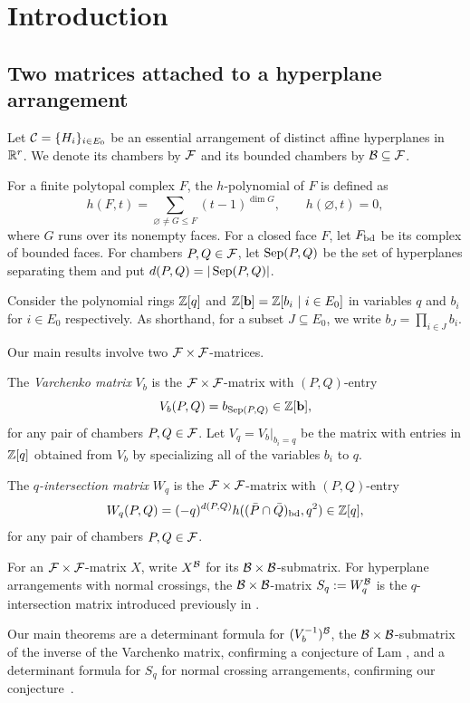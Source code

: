 \section{Introduction}
\subsection{Two matrices attached to a hyperplane arrangement}
Let $\mathcal C=\{H_i\}_{i\in E_0}$ be an essential arrangement of distinct
affine hyperplanes in $\mathbb R^r$. We denote its chambers by $\mathcal F$ and its
bounded chambers by $\mathcal B\subseteq\mathcal F$.

For a finite polytopal complex $F$, the $h$-polynomial of $F$ is defined as
\[
 h(F,t)=\sum_{\varnothing\ne G\leq F}(t-1)^{\dim G},
 \qquad h(\varnothing,t)=0,
\]
where $G$ runs over its nonempty faces. For a closed face $F$, let
$F_{\mathrm{bd}}$ be its complex of bounded faces. For chambers
$P,Q\in\mathcal F$, let $\operatorname{Sep}(P,Q)$ be the set of hyperplanes separating
them and put $d(P,Q)=|\operatorname{Sep}(P,Q)|$. 

Consider the polynomial rings $\mathbb Z[q]$ and $\mathbb Z[\mathbf b] = \mathbb Z[b_i~|~i\in E_0]$ in variables $q$ and $b_i$ for $i \in E_0$ respectively.   As shorthand, for a subset $J \subseteq E_0$, we write $b_J=\prod_{i\in J}b_i$.

Our main results involve two $\mathcal F\times \mathcal F$-matrices. 

\begin{definition}\cite{Varchenko1993} The \textit{Varchenko matrix} $V_b$ is the $\mathcal F\times \mathcal F$-matrix with $(P,Q)$-entry
\[
 V_b(P,Q)=b_{\operatorname{Sep}(P,Q)} \in \mathbb Z[\mathbf b],
\]
for any pair of chambers $P,Q\in\mathcal F$.  Let $V_q=V_b|_{b_i=q}$ be the matrix with entries in $\mathbb Z[q]$ obtained from $V_b$ by specializing all of the variables $b_i$ to $q$.
\end{definition}

\begin{definition} The \textit{$q$-intersection matrix} $W_q$ is the $\mathcal F\times \mathcal F$-matrix with $(P,Q)$-entry
\[
W_q(P,Q)=(-q)^{d(P,Q)}h((\bar P\cap\bar Q)_{\mathrm{bd}},q^2) \in \mathbb Z[q],
\]
for any pair of chambers $P,Q\in\mathcal F$.  
\end{definition}

For an $\mathcal F \times \mathcal F$-matrix $X$, write $X^{\mathcal B}$ for its
$\mathcal B\times\mathcal B$-submatrix. For hyperplane arrangements with normal crossings, the $\mathcal B \times \mathcal B$-matrix $S_q:=W_q^{\mathcal B}$ is the $q$-intersection matrix introduced previously in \cite{EM}.

Our main theorems are a determinant formula for $(V_b^{-1})^{\mathcal B}$, the $\mathcal B \times \mathcal B$-submatrix of the inverse of the Varchenko matrix, confirming a conjecture of Lam \cite[Conjecture 8.10]{Lam}, and a determinant formula for $S_q$ for normal crossing arrangements, confirming our conjecture~\cite[Conjecture 1.7]{EM}.

